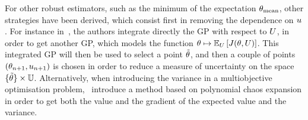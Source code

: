 \documentclass[../../Main_ManuscritThese.tex]{subfiles}
\begin{document}
For other robust estimators, such as the minimum of the expectation ${\theta}_{\mathrm{mean}}$, other strategies have been derived, which consist first in removing the dependence on $u$. For instance in~\cite{janusevskis_simultaneous_2010}, the authors integrate directly the GP with respect to $U$, in order to get another GP, which models the function $\theta\mapsto \mathbb{E}_{U}\left[J(\theta, U)\right]$. This integrated GP will then be used to select a point $\tilde{\theta}$, and then a couple of points $(\theta_{n+1},u_{n+1})$ is chosen in order to reduce a measure of uncertainty on the space $\{\tilde{\theta}\}\times \mathbb{U}$.
Alternatively, when introducing the variance in a multiobjective optimisation problem,~\cite{miranda_adjoint-based_2016} introduce a method based on polynomial chaos expansion in order to get both the value and the gradient of the expected value and the variance.





\end{document}
